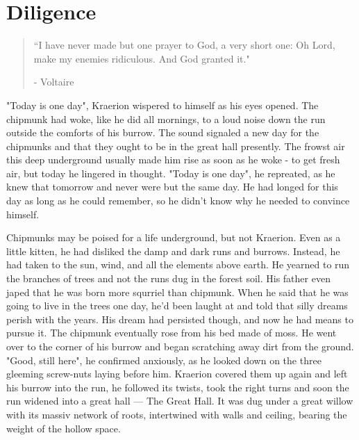 \chapter{Diligence}

\vspace{-1.3cm}
\begin{localsize}{10}
	\begin{quote}
		“I have never made but one prayer to God, a very short one: Oh Lord, make my enemies ridiculous. And God granted it."
		\begin{flushright}- Voltaire \end{flushright}
	\end{quote}
\end{localsize}
\vspace{1cm}

"Today is one day", Kraerion wispered to himself as his eyes opened. The chipmunk had woke, like he did all mornings, to a loud noise down the run outside the comforts of his burrow. The sound signaled a new day for the chipmunks and that they ought to be in the great hall presently. The frowst air this deep underground usually made him rise as soon as he woke - to get fresh air, but today he lingered in thought.
"Today is one day", he repreated, as he knew that tomorrow and never were but the same day. He had longed for this day as long as he could remember, so he didn't know why he needed to convince himself.

Chipmunks may be poised for a life underground, but not Kraerion. Even as a little kitten, he had disliked the damp and dark runs and burrows. Instead, he had taken to the sun, wind, and all the elements above earth. He yearned to run the branches of trees and not the runs dug in the forest soil. His father even japed that he was born more squrriel than chipmunk. When he said that he was going to live in the trees one day, he'd been laught at and told that silly dreams perish with the years. His dream had persisted though, and now he had means to pursue it. 
  The chipmunk eventually rose from his bed made of moss. He went over to the corner of his burrow and began scratching away dirt from the ground.
"Good, still here", he confirmed anxiously, as he looked down on the three gleeming screw-nuts laying before him. Kraerion covered them up again and left his burrow into the run, he followed its twists, took the right turns and soon the run widened into a great hall — The Great Hall. It was dug under a great willow with its massiv network of roots, intertwined with walls and ceiling, bearing the weight of the hollow space.

